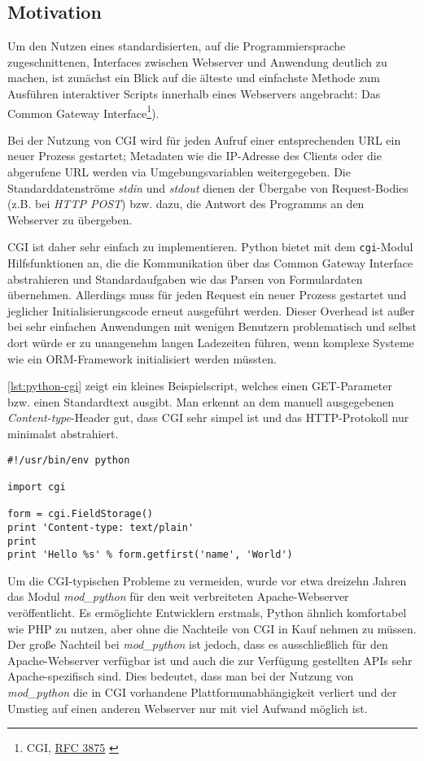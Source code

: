 \subsection{Motivation}

Um den Nutzen eines standardisierten, auf die Programmiersprache zugeschnittenen, Interfaces
zwischen Webserver und Anwendung deutlich zu machen, ist zunächst ein Blick auf die älteste und
einfachste Methode zum Ausführen interaktiver Scripts innerhalb eines Webservers angebracht: Das
Common Gateway Interface\footnote{CGI, \href{http://www.ietf.org/rfc/rfc3875}{RFC 3875}
\citep{rfc3875}}).

Bei der Nutzung von CGI wird für jeden Aufruf einer entsprechenden URL ein neuer Prozess gestartet;
Metadaten wie die IP-Adresse des Clients oder die abgerufene URL werden via Umgebungsvariablen
weitergegeben. Die Standarddatenströme \emph{stdin} und \emph{stdout} dienen der Übergabe von
Request-Bodies (z.B. bei \emph{HTTP POST}) bzw. dazu, die Antwort des Programms an den
Webserver zu übergeben.

CGI ist daher sehr einfach zu implementieren. Python bietet mit dem \lstinline{cgi}-Modul
Hilfsfunktionen an, die die Kommunikation über das Common Gateway Interface abstrahieren und
Standardaufgaben wie das Parsen von Formulardaten übernehmen.
Allerdings muss für jeden Request ein neuer Prozess gestartet und jeglicher Initialisierungscode
erneut ausgeführt werden. Dieser Overhead ist außer bei sehr einfachen Anwendungen mit wenigen
Benutzern problematisch und selbst dort würde er zu unangenehm langen Ladezeiten führen, wenn
komplexe Systeme wie ein ORM-Framework initialisiert werden müssten.

\autoref{lst:python-cgi} zeigt ein kleines Beispielscript, welches einen GET-Parameter bzw. einen
Standardtext ausgibt. Man erkennt an dem manuell ausgegebenen \emph{Content-type}-Header gut, dass
CGI sehr simpel ist und das HTTP-Protokoll nur minimalst abstrahiert.

\begin{lstlisting}[caption=Python-CGI-Script,label=lst:python-cgi]
#!/usr/bin/env python

import cgi

form = cgi.FieldStorage()
print 'Content-type: text/plain'
print
print 'Hello %s' % form.getfirst('name', 'World')
\end{lstlisting}

Um die CGI-typischen Probleme zu vermeiden, wurde vor etwa dreizehn Jahren das Modul
\emph{mod\_python} für den weit verbreiteten Apache-Webserver veröffentlicht. Es ermöglichte
Entwicklern erstmals, Python ähnlich komfortabel wie PHP zu nutzen, aber ohne die Nachteile von CGI
in Kauf nehmen zu müssen. Der große Nachteil bei \emph{mod\_python} ist jedoch, dass es
ausschließlich für den Apache-Webserver verfügbar ist und auch die zur Verfügung gestellten APIs
sehr Apache-spezifisch sind. Dies bedeutet, dass man bei der Nutzung von \emph{mod\_python} die in
CGI vorhandene Plattformunabhängigkeit verliert und der Umstieg auf einen anderen Webserver nur mit
viel Aufwand möglich ist.

